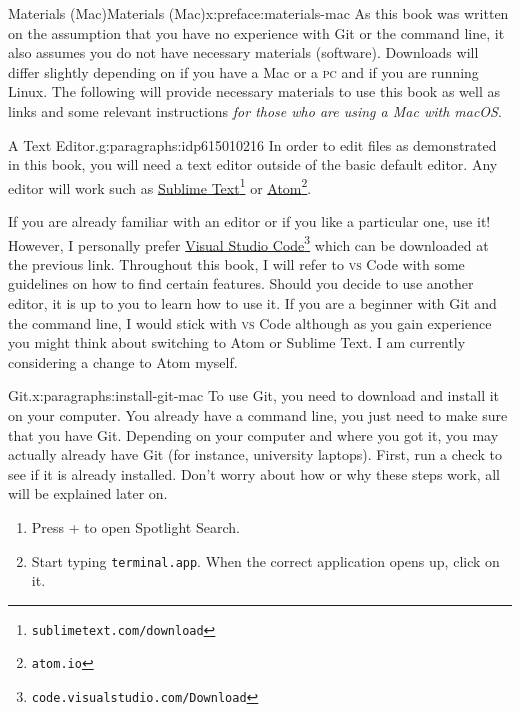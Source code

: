 \documentclass[oneside,10pt,]{book}
\newcommand{\mono}[1]{\texttt{#1}}
\newcommand{\initialism}[1]{\textsc{\MakeLowercase{#1}}}
\newcommand{\kbd}[1]{\keys{{#1}}}
\begin{document}
%
\begin{preface}{Materials (Mac)}{}{Materials (Mac)}{}{}{x:preface:materials-mac}
As this book was written on the assumption that you have no experience with Git or the command line, it also assumes you do not have necessary materials (software). Downloads will differ slightly depending on if you have a Mac or a \initialism{PC} and if you are running Linux. The following will provide necessary materials to use this book as well as links and some relevant instructions \emph{for those who are using a Mac with macOS}.%
\begin{paragraphs}{A Text Editor.}{g:paragraphs:idp615010216}%
In order to edit files as demonstrated in this book, you will need a text editor outside of the basic default editor. Any editor will work such as \href{https://www.sublimetext.com/download}{Sublime Text}\footnote{\nolinkurl{sublimetext.com/download}\label{g:fn:idp615009320}} or \href{https://atom.io}{Atom}\footnote{\nolinkurl{atom.io}\label{g:fn:idp615009576}}.%
\par
If you are already familiar with an editor or if you like a particular one, use it! However, I personally prefer \href{}{Visual Studio Code}\footnote{\nolinkurl{code.visualstudio.com/Download}\label{g:fn:idp615016104}} which can be downloaded at the previous link. Throughout this book, I will refer to \initialism{VS} Code with some guidelines on how to find certain features. Should you decide to use another editor, it is up to you to learn how to use it. If you are a beginner with Git and the command line, I would stick with \initialism{VS} Code although as you gain experience you might think about switching to Atom or Sublime Text. I am currently considering a change to Atom myself.%
\end{paragraphs}%
\begin{paragraphs}{Git.}{x:paragraphs:install-git-mac}%
To use Git, you need to download and install it on your computer. You already have a command line, you just need to make sure that you have Git. Depending on your computer and where you got it, you may actually already have Git (for instance, university laptops). First, run a check to see if it is already installed. Don't worry about how or why these steps work, all will be explained later on.%
\begin{enumerate}
\item{}Press \kbd{Command} + \kbd{Space} to open Spotlight Search.%
\item{}Start typing \mono{terminal.app}. When the correct application opens up, click on it.%

\end{enumerate}
\end{paragraphs}
\end{preface}
\end{document}
